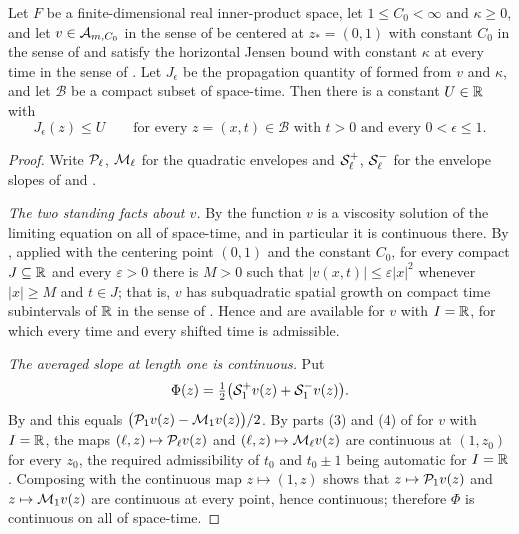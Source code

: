 \begin{helper}
Let $F$ be a finite-dimensional real inner-product space, let $1\le C_0<\infty$
and $\kappa\ge0$, and let $v\in\mathcal{A}_{m,C_0}$ in the sense of
 be centered at $z_*=(0,1)$ with constant $C_0$ in the
sense of  and satisfy the horizontal Jensen bound with
constant $\kappa$ at every time in the sense of . Let
$J_\epsilon$ be the propagation quantity of  formed from $v$ and
$\kappa$, and let $\mathcal B$ be a compact subset of space-time. Then there is
a constant $U\in\mathbb{R}$ with
\[
  J_\epsilon(z)\le U\qquad
  \text{for every }z=(x,t)\in\mathcal B\text{ with }t>0
  \text{ and every }0<\epsilon\le1 .
\]
\end{helper}
\begin{proof}
Write $\mathcal{P}_\ell$, $\mathcal{M}_\ell$ for the quadratic envelopes and
$\mathcal{S}^+_\ell$, $\mathcal{S}^-_\ell$ for the envelope slopes of 
and .

\emph{The two standing facts about $v$.} By  the function
$v$ is a viscosity solution of the limiting equation on all of space-time, and
in particular it is continuous there. By , applied
with the centering point $(0,1)$ and the constant $C_0$, for every compact
$J\subseteq\mathbb{R}$ and every $\varepsilon>0$ there is $M>0$ such that
$|v(x,t)|\le\varepsilon|x|^2$ whenever $|x|\ge M$ and $t\in J$; that is, $v$ has
subquadratic spatial growth on compact time subintervals of $\mathbb{R}$ in the sense of
. Hence  and
 are available for $v$ with $I=\mathbb{R}$, for which
every time and every shifted time is admissible.

\emph{The averaged slope at length one is continuous.} Put
\[
  \Phi(z)=\tfrac12\bigl(\mathcal{S}^+_1v(z)+\mathcal{S}^-_1v(z)\bigr).
\]
By  and  this equals
$\bigl(\mathcal{P}_1v(z)-\mathcal{M}_1v(z)\bigr)/2$. By parts (3) and (4) of
 for $v$ with $I=\mathbb{R}$, the maps
$(\ell,z)\mapsto\mathcal{P}_\ell v(z)$ and $(\ell,z)\mapsto\mathcal{M}_\ell v(z)$ are
continuous at $(1,z_0)$ for every $z_0$, the required admissibility of $t_0$ and
$t_0\pm1$ being automatic for $I=\mathbb{R}$. Composing with the continuous map
$z\mapsto(1,z)$ shows that $z\mapsto\mathcal{P}_1v(z)$ and $z\mapsto\mathcal{M}_1v(z)$ are
continuous at every point, hence continuous; therefore $\Phi$ is continuous on
all of space-time.


\end{proof}
